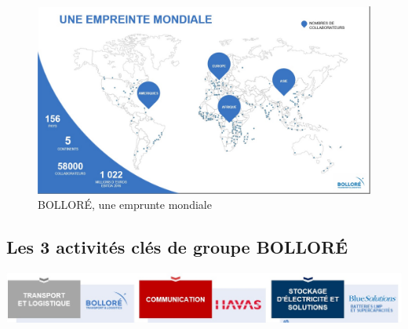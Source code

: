 \documentclass[a4paper,12pt]{report}
\begin{document}
\begin{figure}[H]
	\begin{center}
			\includegraphics[width=0.9\linewidth]{images_BOLLORE/emprunte}
	\end{center}
	\caption{BOLLORÉ, une emprunte mondiale}
	\label{fig:1}	
\end{figure}

\subsection{Les 3 activités clés de groupe BOLLORÉ}

	\begin{center}
		\includegraphics[width=1\linewidth]{images_BOLLORE/activite_bollore}
	\end{center}
	
\end{document}
